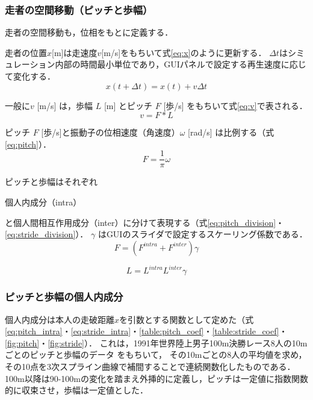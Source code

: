 \documentclass{jsai2e}
\newif\ifshowlabels
\newcommand{\tagtext}[3]{%
  \ifshowlabels
    \textcolor{#1}{#3\textsuperscript{\textsf{[#2]}}}%
  \else
    #3%
  \fi
}
\newcommand{\fix}[2]{\tagtext{fixred}{#1}{#2}}
\begin{document}
\subsubsection{走者の空間移動（ピッチと歩幅）}\label{subsubsec:locomotion}
走者の空間移動も，位相をもとに定義する．
\fix{}{
走者の位置$x$[m]は走速度$v$[m/s]をもちいて式\ref{eq:x}のように更新する．
$\Delta t$はシミュレーション内部の時間最小単位であり，GUIパネルで設定する再生速度に応じて変化する．
\begin{equation}
  \label{eq:x}
  x(t+\Delta t) = x(t) + v \Delta t
\end{equation}
}
一般に$v$ [m/s] は，歩幅 $L$ [m] とピッチ $F$ [歩/s] をもちいて式\ref{eq:v}で表される．
\begin{equation}
  \label{eq:v}
\fix{}{v = F * L}
\end{equation}

ピッチ $F$ [歩/s]と振動子の位相速度（角速度）$\omega$ [rad/s] は比例する（式\ref{eq:pitch}）．
\begin{equation}
  \label{eq:pitch}
  F = \frac{1}{\pi}  \omega
\end{equation}


ピッチと歩幅はそれぞれ\fix{}{個人内成分（intra）}と個人間相互作用成分（inter）に分けて表現する（式\ref{eq:pitch_division}・\ref{eq:stride_division}）．
$\gamma$ はGUIのスライダで設定するスケーリング係数である．
\begin{equation}
  \label{eq:pitch_division}
F = (F^{intra} + F^{inter}) \gamma
\end{equation}

\begin{equation}
  \label{eq:stride_division}
L = L^{intra} L^{inter} \gamma
\end{equation}

\subsubsection{ピッチと歩幅の個人内成分}\label{subsubsec:intra_component}
個人内成分は本人の走破距離$x$を引数とする関数として定めた（式\ref{eq:pitch_intra}・\ref{eq:stride_intra}・\ref{table:pitch_coef}・\ref{table:stride_coef}・\ref{fig:pitch}・\ref{fig:stride}）．
これは，1991年世界陸上男子100m決勝レース8人の10mごとのピッチと歩幅のデータ\cite{ae1992} をもちいて，
その10mごとの8人の平均値を求め，その10点を3次スプライン曲線で補間することで連続関数化したものである．
100m以降は90-100mの変化を踏まえ外挿的に定義し，ピッチは一定値に指数関数的に収束させ，歩幅は一定値とした．
\end{document}
